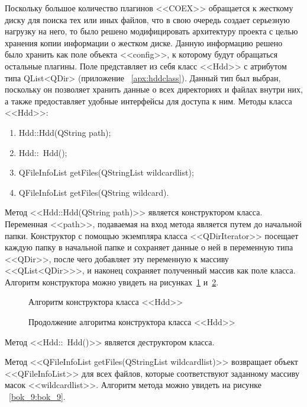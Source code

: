 Поскольку большое количество плагинов <<COEX>> обращается к жесткому диску для поиска тех или иных файлов, что в свою очередь создает серьезную нагрузку на него, то было решено модифицировать архитектуру проекта с целью хранения копии информации о жестком диске. Данную информацию решено было хранить как поле объекта <<config>>, к которому будут обращаться остальные плагины. Поле представляет из себя класс <<Hdd>> с атрибутом типа QList<QDir> (приложение ~\ref{apx:hddclass}). Данный тип был выбран, поскольку он позволяет хранить данные о всех директориях и файлах внутри них, а также предоставляет удобные интерфейсы для доступа к ним. Методы класса <<Hdd>>:

\begin{enumerate}
  \item Hdd::Hdd(QString path);
  \item Hdd::~Hdd();
  \item QFileInfoList getFiles(QStringList wildcardlist);
  \item QFileInfoList getFiles(QString wildcard).
\end{enumerate}

Метод <<Hdd::Hdd(QString path)>> является конструктором класса. Переменная <<path>>, подаваемая на вход метода является путем до начальной папки. Конструктор с помощью экземпляра класса <<QDirIterator>> посещает каждую папку в начальной папке и сохраняет данные о ней в переменную типа <<QDir>>, после чего добавляет эту переменную к массиву <<QList<QDir>>>, и наконец сохраняет полученный массив как поле класса. Алгоритм конструктора можно увидеть на рисунках~\ref{bok_6:bok_6} и~\ref{bok_7:bok_7}.

\begin{figure}[h!]
\caption{ Алгоритм конструктора класса <<Hdd>> }
\label{bok_6:bok_6}
\end{figure}

\begin{figure}[h!]
\caption{ Продолжение алгоритма конструктора класса <<Hdd>> }
\label{bok_7:bok_7}
\end{figure}

Метод <<Hdd::~Hdd()>> является деструктором класса.

Метод <<QFileInfoList getFiles(QStringList wildcardlist)>> возвращает объект <<QFileInfoList>> для всех файлов, которые соответствуют заданному массиву масок <<wildcardlist>>. Алгоритм метода можно увидеть на рисунке ~\ref{bok_9:bok_9}.

